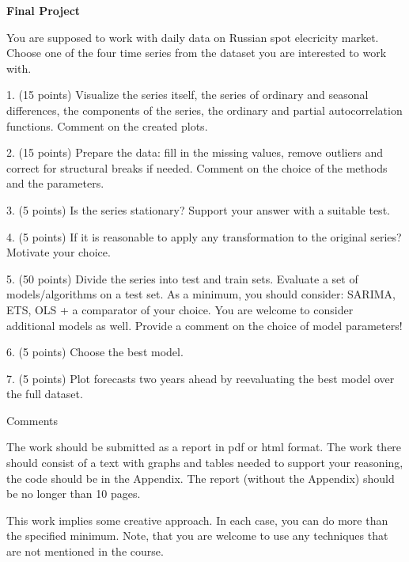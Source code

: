\documentclass[a4paper]{article}
\begin{document}
\begin{enumerate}








\end{enumerate}

\textbf{Final Project }


You are supposed to work with daily data on Russian spot elecricity market. Choose one of the four time series from the dataset you are interested to work with.

1. (15 points) Visualize the series itself, the series of ordinary and seasonal differences, the components of the series, the ordinary and partial autocorrelation functions. Comment on the created plots.

2. (15 points) Prepare the data: fill in the missing values, remove outliers and correct for structural breaks if needed. Comment on the choice of the methods and the parameters.

3. (5 points) Is the series stationary? Support your answer with a suitable test.

4. (5 points) If it is reasonable to apply any transformation to the original series? Motivate your choice.

5. (50 points) Divide the series into test and train sets. Evaluate a set of models/algorithms on a test set. As a minimum, you should consider: SARIMA, ETS, OLS + a comparator of your choice. You are welcome to consider additional models as well. Provide a comment on the choice of model parameters!

6. (5 points) Choose the best model.

7. (5 points) Plot forecasts two years ahead by reevaluating the best model over the full dataset.

Comments

The work should be submitted as a report in pdf or html format. The work there should consist of a text with graphs and tables needed to support your reasoning, the code should be in the Appendix. The report (without the Appendix) should be no longer than 10 pages.

This work implies some creative approach. In each case, you can do more than the specified minimum. Note, that you are welcome to use any techniques that are not mentioned in the course.
\end{document}
